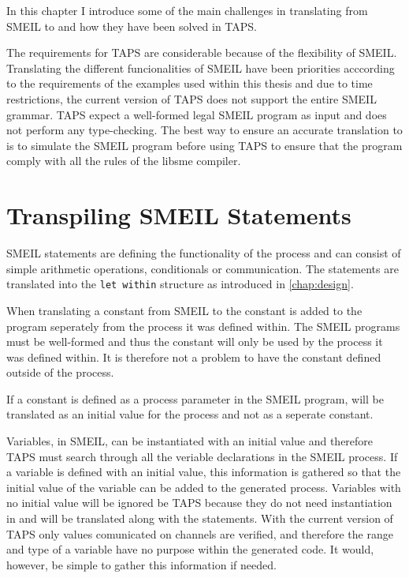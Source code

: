 In this chapter I introduce some of the main challenges in translating from SMEIL to \cspm{} and how they have been solved in TAPS.

The requirements for TAPS are considerable because of the flexibility of SMEIL. Translating the different funcionalities of SMEIL have been priorities acccording to the requirements of the examples used within this thesis and due to time restrictions, the current version of TAPS does not support the entire SMEIL grammar. TAPS expect a well-formed legal SMEIL program as input and does not perform any type-checking. The best way to ensure an accurate translation to \cspm{} is to simulate the SMEIL program before using TAPS to ensure that the program comply with all the rules of the libsme compiler.
\section{Transpiling SMEIL Statements}
SMEIL statements are defining the functionality of the process and can consist of simple arithmetic operations, conditionals or communication.
The statements are translated into the \texttt{let within} structure as introduced in \ref{chap:design}.

When translating a constant from SMEIL to \cspm{} the constant is added to the \cspm{} program seperately from the process it was defined within.
The SMEIL programs must be well-formed and thus the constant will only be used by the process it was defined within. It is therefore not a problem to have the constant defined outside of the \cspm{} process.

If a constant is defined as a process parameter in the SMEIL program, will be translated as an initial value for the process and not as a seperate \cspm{} constant.

Variables, in SMEIL, can be instantiated with an initial value and therefore TAPS must search through all the veriable declarations in the SMEIL process. If a variable is defined with an initial value, this information is gathered so that the initial value of the variable can be added to the generated \cspm{} process.
Variables with no initial value will be ignored be TAPS because they do not need instantiation in \cspm{} and will be translated along with the statements. With the current version of TAPS only values comunicated on channels are verified, and therefore the range and type of a variable have no purpose within the generated \cspm{} code. It would, however, be simple to gather this information if needed.\\

